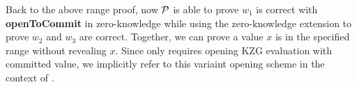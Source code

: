 Back to the above range proof, now $\mathcal{P}$ is able to prove $w_1$ is correct with \textbf{openToCommit} in zero-knowledge while using the zero-knowledge extension to prove $w_2$ and $w_3$ are correct. Together, we can prove a value $x$ is in the specified range without revealing $x$. Since only \bootstrap requires opening KZG evaluation with committed value, we implicitly refer to this variaint opening scheme in the context of \bootstrap.

